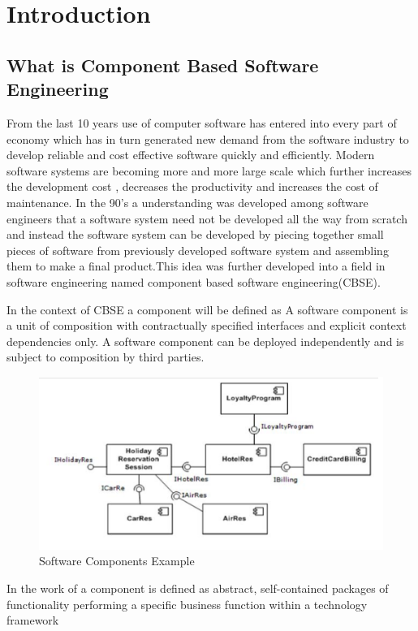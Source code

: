 \documentclass[12pt]{article}
\begin{document}
\section{Introduction}
\subsection{What is Component Based Software Engineering}
From the last 10 years use of computer software has entered into every part of economy which has in turn generated new demand from the software industry to develop reliable and cost effective software quickly and efficiently.
Modern software systems are becoming more and more large scale which further increases the development cost , decreases the productivity and increases the cost of maintenance.
In the 90's a understanding was developed among software engineers that a software system need not be developed all the way from scratch and instead the software system can be developed by piecing together small pieces of software from previously developed software system and assembling them to make a final product.This idea was further developed into a field in software engineering named component based software engineering(CBSE).

In the context of CBSE a component will be defined as A software component is a unit of composition
with contractually specified interfaces and explicit context
dependencies only. A software component can be deployed
independently and is subject to composition by third
parties.

\begin{figure}
	\includegraphics{softwareComponentExample.png}
	\caption{Software Components Example}
\end{figure}

In the work of \cite{componentDef} a component is defined as abstract, self-contained
packages of functionality performing a specific business function within a technology framework
\end{document}
